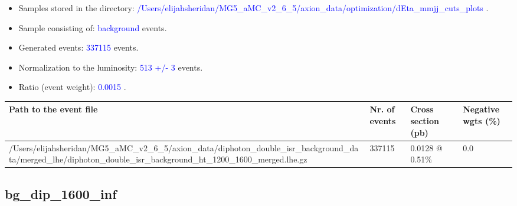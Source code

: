 \documentclass[a4paper, 10pt]{article}
\begin{document}
\begin{itemize}
  \item Samples stored in the directory: \textcolor{blue}{/\-Users/\-elijahsheridan/\-MG5\_aMC\_v2\_6\_5/\-axion\_data/\-optimization/\-dEta\_mmjj\_cuts\_plots} .
   \item Sample consisting of: \textcolor{blue}{background}  events.
   \item Generated events: \textcolor{blue}{337115 }  events.
   \item Normalization to the luminosity: \textcolor{blue}{513}\textcolor{blue}{ +/\-- }\textcolor{blue}{3 }  events.
   \item Ratio (event weight): \textcolor{blue}{0.0015 } .  
 
\end{itemize}
\begin{table}[H]
  \begin{center}
    \begin{tabular}{|m{55.0mm}|m{25.0mm}|m{30.0mm}|m{30.0mm}|}
      \hline
      {\cellcolor{yellow}         Path to the event file}& {\cellcolor{yellow}         Nr. of events}& {\cellcolor{yellow}         Cross section (pb)}& {\cellcolor{yellow}         Negative wgts (\%)}\\
      \hline
      {\cellcolor{white}          /\-Users/\-elijahsheridan/\-MG5\_aMC\_v2\_6\_5/\-axion\_data/\-diphoton\_double\_isr\_background\_data/\-merged\_lhe/\-diphoton\_double\_isr\_background\_ht\_1200\_1600\_merged.lhe.gz}& {\cellcolor{white}          337115}& {\cellcolor{white}          0.0128 @ 0.51\%}& {\cellcolor{white}          0.0}\\
\hline
    \end{tabular}
  \end{center}
\end{table}

\subsection{ bg\_dip\_1600\_inf}
\end{document}

